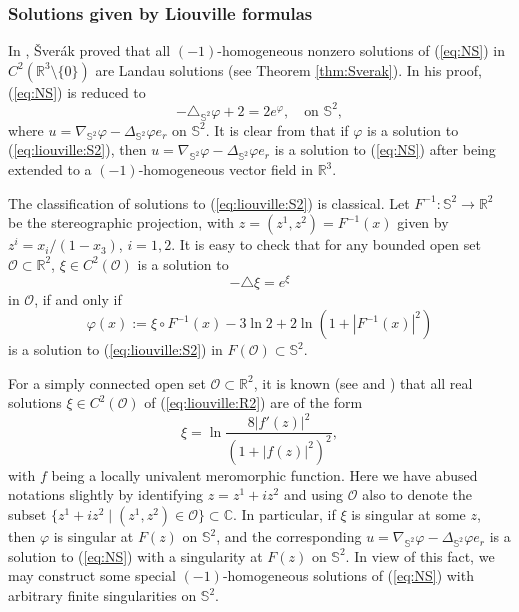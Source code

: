 \documentclass[12pt]{article}
\newcommand{\R}{\mathbb{R}}
\newcommand{\bS}{\mathbb{S}}
\begin{document}
\subsubsection{Solutions given by Liouville formulas}

In \cite{Sverak}, \v{S}ver\'{a}k proved that all $(-1)$-homogeneous nonzero solutions of (\ref{eq:NS}) in $C^2(\mathbb{R}^3\setminus\{0\})$ are Landau solutions (see Theorem \ref{thm:Sverak}). In his proof, (\ref{eq:NS}) is reduced to 
\begin{equation}\label{eq:liouville:S2}
	-\triangle_{\mathbb{S}^2} \varphi + 2 = 2 e^{\varphi}, \quad \mbox{on } \mathbb{S}^2, 
\end{equation}
where $u=\nabla_{\mathbb{S}^2} \varphi-\Delta_{\mathbb{S}^2} \varphi e_r$ on $\mathbb{S}^2$. It is clear from \cite{Sverak} that if $\varphi$ is a solution to (\ref{eq:liouville:S2}), then $u=\nabla_{\mathbb{S}^2} \varphi-\Delta_{\mathbb{S}^2} \varphi e_r$ is a solution to (\ref{eq:NS}) after being extended to a $(-1)$-homogeneous vector field in $\mathbb{R}^3$. 

The classification of solutions to (\ref{eq:liouville:S2}) is classical. Let $F^{-1}: \mathbb{S}^2\to \R^2$ be the stereographic projection, with $z=(z^1, z^2)=F^{-1}(x)$ given by $z^i = x_i/(1-x_3)$, $i=1, 2$. It is easy to check that for any bounded open set $\mathcal{O}\subset \mathbb{R}^2$, $\xi\in C^2(\mathcal{O})$ is a solution to 
\begin{equation}\label{eq:liouville:R2}
	- \triangle \xi = e^\xi 
\end{equation}
in $\mathcal{O}$, if and only if 
\begin{equation}\label{eq:liouville:phi} 
	\varphi(x):= \xi \circ F^{-1}(x) - 3\ln 2 + 2 \ln (1+| F^{-1}(x) |^2) 
\end{equation}
is a solution to (\ref{eq:liouville:S2}) in $F(\mathcal{O})\subset \mathbb{S}^2$. 

For a simply connected open set $\mathcal{O}\subset \mathbb{R}^2$, it is known (see \cite{Liouville} and \cite{CW}) that all real solutions $\xi\in C^2(\mathcal{O})$ of (\ref{eq:liouville:R2}) are of the form 
\begin{equation}\label{eq:liouville:xi}
	\xi = \ln \frac{8 |f'(z)|^2}{(1+|f(z)|^2)^2}, 
\end{equation}
with $f$ being a locally univalent meromorphic function. Here we have abused notations slightly by identifying $z = z^1 + i z^2$ and using $\mathcal{O}$ also to denote the subset $\{z^1 + i z^2 \mid (z^1, z^2) \in \mathcal{O}\} \subset \mathbb{C}$. In particular, if $\xi$ is singular at some $z$, then $\varphi$ is singular at $F(z)$ on $\mathbb{S}^2$, and the corresponding $u=\nabla_{\bS^2} \varphi-\Delta_{\bS^2} \varphi e_r$ is a solution to (\ref{eq:NS}) with a singularity at $F(z)$ on $\mathbb{S}^2$. In view of this fact, we may construct some special $(-1)$-homogeneous solutions of (\ref{eq:NS}) with arbitrary finite singularities on $\mathbb{S}^2$. 
\end{document}
